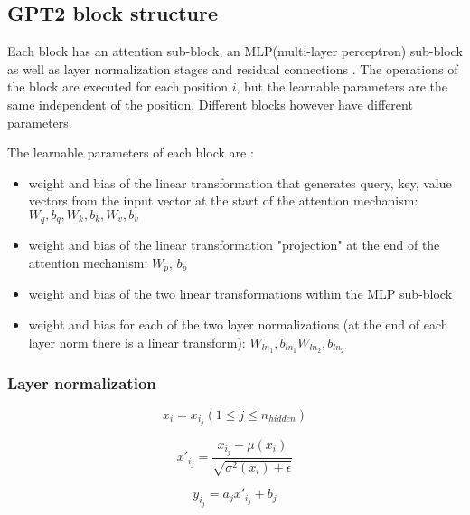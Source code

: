 \subsection{GPT2 block structure}

\label{gpt2:block}


Each block has an attention sub-block, an MLP(multi-layer perceptron) sub-block as well as layer normalization stages and residual connections  .
The operations of the block are executed for each position $i$, but the learnable parameters are the same independent of the position. Different blocks however have different parameters.

The learnable parameters of each block are \cite{alammar-gpt2}:

\begin{itemize}
\item weight and bias of the linear transformation that generates query, key, value vectors from the input vector
   at the start of the attention mechanism: $W_q, b_q, W_k, b_k, W_v, b_v$
 \item weight and bias of the linear transformation "projection" at the end of the attention mechanism: $W_p$, $b_p$
 \item weight and bias of the two linear transformations within the MLP sub-block
 \item weight and bias for each of the two layer normalizations (at the end of each layer norm there is a linear transform): $W_{ln_1}, b_{ln_1} W_{ln_2}, b_{ln_2}$
\end{itemize}

\subsubsection{Layer normalization}
\label{gpt2:layernorm}


$$x_i = x_{i_j} (1 \leq j \leq n_{hidden})$$

$$x'_{i_j} = \frac {x_{i_j} - \mu(x_i)} {\sqrt {\sigma^2(x_i)+\epsilon}} $$

$$y_{i_j} = a_j x'_{i_j} + b_j$$

